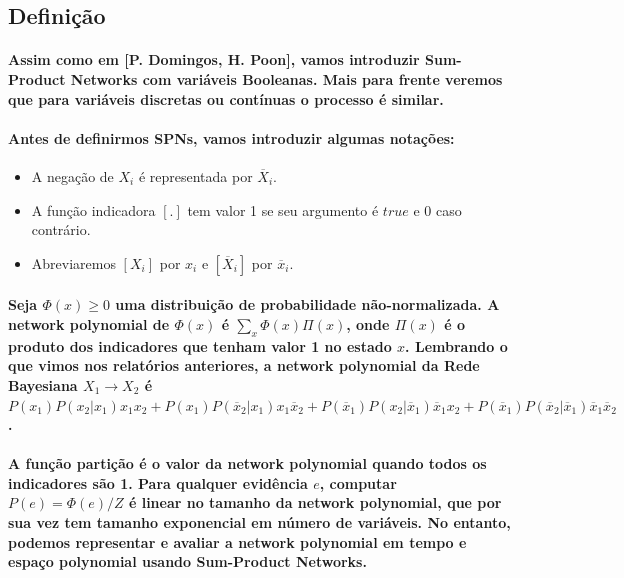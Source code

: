 \documentclass[a4paper,10pt]{article}
\theoremstyle{plain}
\begin{document}
\subsection{Definição}

\paragraph{
  Assim como em [P. Domingos, H. Poon]\cite{poon-domingos}, vamos introduzir Sum-Product Networks
  com variáveis Booleanas. Mais para frente veremos que para variáveis discretas ou contínuas o
  processo é similar.
}

\paragraph{
  Antes de definirmos SPNs, vamos introduzir algumas notações:
}

\begin{itemize}
  \item A negação de $X_i$ é representada por $\overline{X}_i$.
  \item A função indicadora\cite{report-1} $[.]$ tem valor 1 se seu argumento é $true$ e 0 caso
    contrário.
  \item Abreviaremos $[X_i]$ por $x_i$ e $[\overline{X}_i]$ por $\overline{x}_i$.
\end{itemize}

\paragraph{
  Seja $\Phi(x) \geq 0$ uma distribuição de probabilidade não-normalizada. A network polynomial
  \cite{report-1} de $\Phi(x)$ é $\sum_x \Phi(x) \Pi (x)$, onde $\Pi(x)$ é o produto dos
  indicadores que tenham valor 1 no estado $x$. Lembrando o que vimos nos relatórios anteriores,
  a network polynomial da Rede Bayesiana $X_1 \to X_2$ é $P(x_1)P(x_2|x_1)x_1x_2+P(x_1)
  P(\overline{x}_2|x_1)x_1\overline{x}_2+P(\overline{x}_1)P(x_2|\overline{x}_1)\overline{x}_1x_2+
  P(\overline{x}_1)P(\overline{x}_2|\overline{x}_1)\overline{x}_1\overline{x}_2$.
}

\paragraph{
  A função partição é o valor da network polynomial quando todos os indicadores são 1. Para
  qualquer evidência $e$, computar $P(e)=\Phi(e)/Z$ é linear no tamanho da network polynomial, que
  por sua vez tem tamanho exponencial em número de variáveis. No entanto, podemos representar e
  avaliar a network polynomial em tempo e espaço polynomial usando Sum-Product Networks.
}
\end{document}
